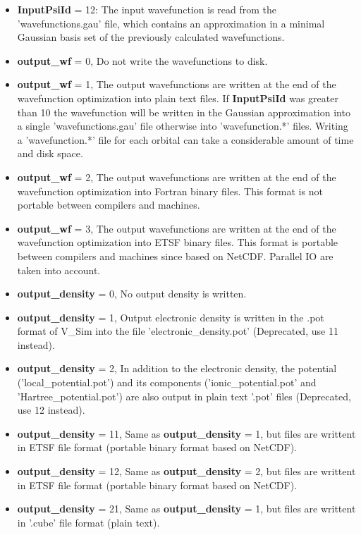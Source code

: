 \documentclass[a4paper,11pt]{report}
\begin{document}
\begin{itemize}
\begin{itemize}
       \item {\bf InputPsiId } = 12: The input wavefunction is read from the 'wavefunctions.gau'  file, which contains an 
            approximation in a minimal Gaussian basis set of the previously calculated wavefunctions.
       \item {\bf output\_wf} = 0, Do not write the wavefunctions to disk.
       \item {\bf output\_wf} = 1, The output wavefunctions are written at the end of the wavefunction optimization 
            into plain text files. If {\bf InputPsiId } was greater than 10 the wavefunction will be written 
            in the Gaussian approximation into  a single 'wavefunctions.gau' file otherwise into 
            'wavefunction.*' files. Writing a  'wavefunction.*' file for each orbital can take a considerable 
            amount of time and disk space. 
       \item {\bf output\_wf} = 2, The output wavefunctions are written at the end of the wavefunction optimization 
            into Fortran binary files. This format is not portable between compilers and machines. 
       \item {\bf output\_wf} = 3, The output wavefunctions are written at the end of the wavefunction optimization 
            into ETSF binary files. This format is portable between compilers and machines since based on NetCDF. Parallel IO are taken into account.
       \item {\bf output\_density} = 0, No output density is written.
       \item {\bf output\_density} = 1, Output electronic density is written in the .pot format of V\_Sim into the file 'electronic\_density.pot' (Deprecated, use 11 instead).
       \item {\bf output\_density} = 2, In addition to the electronic density, the potential ('local\_potential.pot') and its components ('ionic\_potential.pot' and 'Hartree\_potential.pot') are also output in plain text '.pot' files (Deprecated, use 12 instead).
       \item {\bf output\_density} = 11, Same as {\bf output\_density} = 1, but files are writtent in ETSF file format (portable binary format based on NetCDF).
       \item {\bf output\_density} = 12, Same as {\bf output\_density} = 2, but files are writtent in ETSF file format (portable binary format based on NetCDF).
       \item {\bf output\_density} = 21, Same as {\bf output\_density} = 1, but files are writtent in '.cube' file format (plain text).

\end{itemize}
\end{itemize}
\end{document}

